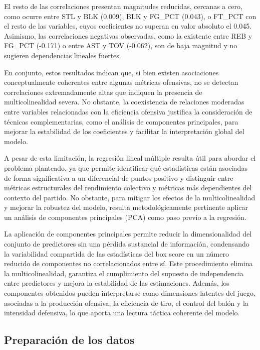 \documentclass[12pt]{article}
\begin{document}
El resto de las correlaciones presentan magnitudes reducidas, cercanas a cero, como ocurre entre STL y BLK (0.009), BLK y FG\_PCT (0.043), o FT\_PCT con el resto de las variables, cuyos coeficientes no superan en valor absoluto el 0.045. Asimismo, las correlaciones negativas observadas, como la existente entre REB y FG\_PCT (-0.171) o entre AST y TOV (-0.062), son de baja magnitud y no sugieren dependencias lineales fuertes.

En conjunto, estos resultados indican que, si bien existen asociaciones conceptualmente coherentes entre algunas métricas ofensivas, no se detectan correlaciones extremadamente altas que indiquen la presencia de multicolinealidad severa. No obstante, la coexistencia de relaciones moderadas entre variables relacionadas con la eficiencia ofensiva justifica la consideración de técnicas complementarias, como el análisis de componentes principales, para mejorar la estabilidad de los coeficientes y facilitar la interpretación global del modelo.



A pesar de esta limitación, la regresión lineal múltiple resulta útil para abordar el problema planteado, ya que permite identificar qué estadísticas están asociadas de forma significativa a un diferencial de puntos positivo y distinguir entre métricas estructurales del rendimiento colectivo y métricas más dependientes del contexto del partido. No obstante, para mitigar los efectos de la multicolinealidad y mejorar la robustez del modelo, resulta metodológicamente pertinente aplicar un análisis de componentes principales (PCA) como paso previo a la regresión.

La aplicación de componentes principales permite reducir la dimensionalidad del conjunto de predictores sin una pérdida sustancial de información, condensando la variabilidad compartida de las estadísticas del box score en un número reducido de componentes no correlacionados entre sí. Este procedimiento elimina la multicolinealidad, garantiza el cumplimiento del supuesto de independencia entre predictores y mejora la estabilidad de las estimaciones. Además, los componentes obtenidos pueden interpretarse como dimensiones latentes del juego, asociadas a la producción ofensiva, la eficiencia de tiro, el control del balón y la intensidad defensiva, lo que aporta una lectura táctica coherente del modelo.


\subsection{Preparación de los datos}
\end{document}
